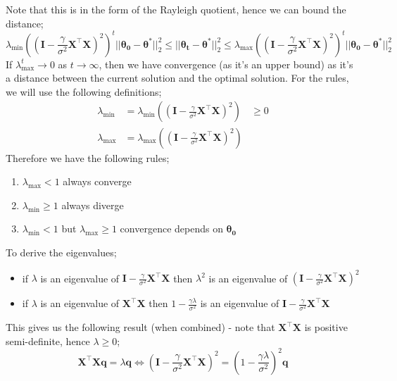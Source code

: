 \documentclass[a4paper, 12pt]{article}
\newcommand{\mat}[1]{\boldsymbol{#1}}
\renewcommand{\vec}[1]{\boldsymbol{#1}}
\begin{document}
            Note that this is in the form of the Rayleigh quotient, hence we can bound the distance;
            $$\lambda_\text{min}((\mat{I} - \frac{\gamma}{\sigma^2}\mat{X}^\top\mat{X})^2)^t || \mat{\theta_0} - \mat{\theta^*} ||_2^2 \leq || \mat{\theta_t} - \mat{\theta^*} ||_2^2 \leq \lambda_\text{max}((\mat{I} - \frac{\gamma}{\sigma^2}\mat{X}^\top\mat{X})^2)^t || \mat{\theta_0} - \mat{\theta^*} ||_2^2$$
            If $\lambda_\text{max}^t \to 0$ as $t \to \infty$, then we have convergence (as it's an upper bound) as it's a distance between the current solution and the optimal solution.
            For the rules, we will use the following definitions;
            \begin{align*}
                \lambda_\text{min} & = \lambda_\text{min}((\mat{I} - \frac{\gamma}{\sigma^2}\mat{X}^\top\mat{X})^2) & \geq 0 \\
                \lambda_\text{max} & = \lambda_\text{max}((\mat{I} - \frac{\gamma}{\sigma^2}\mat{X}^\top\mat{X})^2)
            \end{align*}
            Therefore we have the following rules;
            \begin{enumerate}[1.]
                \itemsep0em
                \item $\lambda_\text{max} < 1$ \hfill always converge
                \item $\lambda_\text{min} \geq 1$ \hfill always diverge
                \item $\lambda_\text{min} < 1$ but $\lambda_\text{max} \geq 1$ \hfill convergence depends on $\vec{\theta_0}$
            \end{enumerate}
            To derive the eigenvalues;
            \begin{itemize}
                \itemsep0em
                \item if $\lambda$ is an eigenvalue of $\mat{I} - \frac{\gamma}{\sigma^2}\mat{X}^\top\mat{X}$ then $\lambda^2$ is an eigenvalue of $(\mat{I} - \frac{\gamma}{\sigma^2}\mat{X}^\top\mat{X})^2$
                \item if $\lambda$ is an eigenvalue of $\mat{X}^\top\mat{X}$ then $1 - \frac{\gamma\lambda}{\sigma^2}$ is an eigenvalue of $\mat{I} - \frac{\gamma}{\sigma^2}\mat{X}^\top\mat{X}$
            \end{itemize}
            This gives us the following result (when combined) - note that $\mat{X}^\top\mat{X}$ is positive semi-definite, hence $\lambda \geq 0$;
            $$\mat{X}^\top\mat{X}\vec{q} = \lambda \vec{q} \Leftrightarrow (\mat{I} - \frac{\gamma}{\sigma^2}\mat{X}^\top\mat{X})^2 = (1 - \frac{\gamma\lambda}{\sigma^2})^2\vec{q}$$
\end{document}
